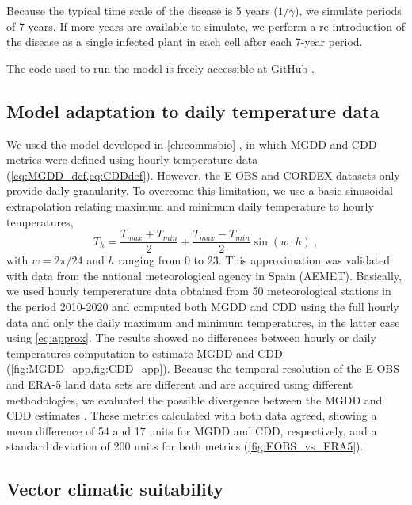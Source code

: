 Because the typical time scale of the disease is 5 years ($1/\gamma$), we
simulate periods of 7 years. If more years are available
to simulate, we perform a re-introduction of the disease as a single infected
plant in each cell after each 7-year period.

The code used to run the model is freely accessible at GitHub
\cite{CODE_2}.

\subsection{Model adaptation to daily temperature data}

We used the model developed in \cref{ch:commsbio}
\cite{GimenezRomero2022_CommsBio}, in which MGDD and CDD metrics were defined
using hourly temperature data (\cref{eq:MGDD_def,eq:CDDdef}). However, the
E-OBS
and CORDEX datasets only provide daily granularity. To overcome this
limitation, we use a basic sinusoidal extrapolation relating maximum and
minimum daily temperature to hourly temperatures,
\begin{equation}\label{eq:approx}
    T_h=\frac{T_{max}+T_{min}}{2} + \frac{T_{max}-T_{min}}{2}\sin(w\cdot h)
    \ ,
\end{equation}
with $w=2\pi/24$ and $h$ ranging from $0$ to $23$. This approximation was
validated with data from the national meteorological agency in Spain (AEMET).
Basically, we used hourly tempererature data obtained from 50 meteorological
stations in the period 2010-2020 and computed both MGDD and CDD using the full
hourly data and only the daily maximum and minimum temperatures, in the latter
case using \cref{eq:approx}. The results showed no differences between hourly
or daily temperatures computation to estimate MGDD and CDD
(\cref{fig:MGDD_app,fig:CDD_app}). Because the temporal resolution
of the E-OBS and ERA-5 land data sets are different and are acquired using
different methodologies, we evaluated the possible divergence between the MGDD
and CDD estimates  \cite{GimenezRomero2022_CommsBio}. These metrics calculated
with both data agreed, showing a mean difference of 54 and 17 units for MGDD
and CDD, respectively, and a standard deviation of 200 units for both metrics
(\cref{fig:EOBS_vs_ERA5}).

\subsection{Vector climatic suitability}

